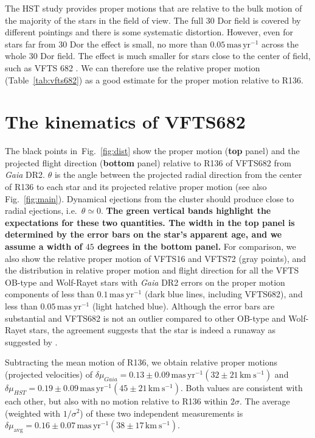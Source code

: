 \documentclass[a4paper,fleqn,usenatbib]{mnras}
\newcommand{\newtext}[1]{{\color{ForestGreen}\bf{#1}}}
\newcommand{\kms}{{\,\mathrm{km\ s^{-1}}}}
\newcommand{\masyr}{\,\mathrm{mas}\,\mathrm{yr}^{-1}}
\DeclareRobustCommand{\Figref}[1]{Fig.~\ref{#1}}
\DeclareRobustCommand{\Tabref}[1]{Table~\ref{#1}}
\begin{document}
The HST study provides proper motions that are relative to the bulk motion
of the majority of the stars in the field of view. The full 30 Dor
field is covered by different pointings and there is some systematic
distortion.  However, even for stars far from 30 Dor the effect is
small, no more than $0.05\masyr$ across the whole 30 Dor field. The
effect is much smaller for stars close to the center of field, such as
VFTS 682 \citep{platais:18}.  We can therefore use the relative proper
motion (\Tabref{tab:vfts682}) as a good estimate for the proper motion relative to R136. 
 
\vspace*{-30pt}
\section{The kinematics of VFTS682}
\label{sec:results}

The black points in~\Figref{fig:dist} show the proper motion 
(\newtext{top} panel) and the projected flight direction (\newtext{bottom} panel) relative
to R136 of
VFTS682 from \emph{Gaia} DR2. $\theta$ is the angle between the projected radial direction from the
center of R136 to each star and its projected relative proper motion
(see also \Figref{fig:main}). Dynamical ejections from the
cluster should %
produce close to radial ejections, i.e.~$\theta\simeq0$. \newtext{The green
vertical bands highlight the expectations for these two quantities. %
The width in the top panel is determined
by the error bars on the star's apparent age, and we assume a width of
$45$ degrees in the bottom panel.} For comparison, we also show the relative
proper motion of VFTS16 and VFTS72 (gray points), and the distribution
in relative proper motion and flight direction for all the VFTS OB-type and Wolf-Rayet stars with
\emph{Gaia} DR2 errors on the proper motion
components of less than $0.1\,\mathrm{mas\ yr^{-1}}$ (dark blue lines,
including VFTS682), and less than $0.05\,\mathrm{mas\ yr^{-1}}$ (light hatched
blue). Although the error bars are substantial and VFTS682 is not
an outlier compared to other OB-type and Wolf-Rayet stars, the agreement
suggests that the star is indeed a runaway as suggested by
\cite{bestenlehner:11}. 

Subtracting
the mean motion of R136, we obtain relative proper motions (projected
velocities) of $\delta \mu_{Gaia}=0.13\pm 0.09\masyr (32\pm 21\kms)$ and
$\delta \mu_{HST}=0.19\pm 0.09\masyr (45 \pm 21\kms )$. Both values
are consistent with each other, but also with no motion relative to R136
within $2\sigma$. The average (weighted with $1/\sigma^2$) of these two independent
measurements is $\delta \mu_\mathrm{avg}=0.16\pm0.07\masyr
(38\pm17\kms)$. 
\end{document}
